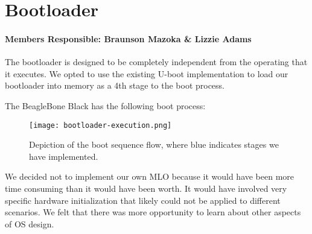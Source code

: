 \documentclass[12pt]{article}
\begin{document}

\pagebreak %

\textcolor{black}{\tableofcontents}

\pagebreak

\section{Bootloader}
\paragraph{Members Responsible: Braunson Mazoka \& Lizzie Adams}
The bootloader is designed to be completely independent from the operating
that it executes. We opted to use the existing U-boot implementation to
load our bootloader into memory as a 4th stage to the boot process.

The BeagleBone Black has the following boot process:
\begin{figure}[!htbp]
	\centering
	\texttt{[image: bootloader-execution.png]}
	\caption{Depiction of the boot sequence flow, where blue indicates stages we have implemented.}
	\label{fig_bootloader}
\end{figure}

We decided not to implement our own MLO because it would have been more time
consuming than it would have been worth. It would have involved very specific
hardware initialization that likely could not be applied to different scenarios.
We felt that there was more opportunity to learn about other aspects of OS design.
\end{document}
